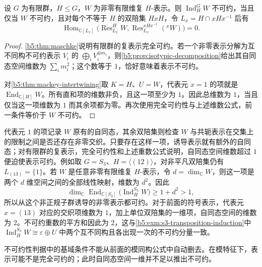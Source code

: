 \begin{theorem}\label{b5:thm:mackey-irreducibility}
	设 \(G\) 为有限群，\(H\leq G\)，\(W\) 为非零有限维复 \(H\)-表示。则 \(\operatorname{Ind}_H^G W\) 不可约，当且仅当 \(W\) 不可约，且对每个不等于 \(H\) 的双陪集 \(HxH\)，令 \(L_x=H\cap xHx^{-1}\) 后有
	\[
		\operatorname{Hom}_{\mathbb C[L_x]} \bigl(\operatorname{Res}_{L_x}^H W, \operatorname{Res}_{L_x}^{xHx^{-1}}({}^xW)\bigr)=0.
	\]
\end{theorem}
\begin{proof}
	\cref{b5:thm:maschke}说明有限群的复表示完全可约。若一个非零表示分解为互不同构不可约表示 \(V_i\) 的 \(\bigoplus_iV_i^{\oplus m_i}\)，则\cref{b5:prop:isotypic-decomposition}给出其自同态空间维数为 \(\sum_i m_i^2\)；这个数等于 \(1\)，恰好意味着表示不可约。

	对\cref{b5:thm:mackey-intertwining}取 \(K=H\)、\(U=W\)，代表元 \(x=1\) 的项就是 \(\operatorname{End}_{\mathbb C[H]}W\)。所有直和项的维数非负，且这一项至少为 \(1\)。因此总维数为 \(1\)，当且仅当这一项维数为 \(1\) 而其余项都为零。再次使用完全可约性与上述维数公式，前一条件等价于 \(W\) 不可约。
\end{proof}

代表元 \(1\) 的项记录 \(W\) 原有的自同态，其余双陪集则检查 \(W\) 与共轭表示在交集上的限制之间是否还存在非零交织。只要存在这样一项，诱导表示就有额外的自同态；对有限群的复表示，完全可约性和上述重数公式说明，自同态空间维数超过 \(1\) 便迫使表示可约。例如取 \(G=S_3\)、\(H=\langle(12)\rangle\)，对非平凡双陪集仍有 \(L_{(13)}=\{1\}\)。若 \(W\) 是任意非零有限维复 \(H\)-表示，令 \(d=\dim_{\mathbb C}W\)，则这一项是两个 \(d\) 维空间之间的全部线性映射，维数为 \(d^2\)。因此
\[
	\dim_{\mathbb C}\operatorname{End}_{\mathbb C[S_3]} \bigl(\operatorname{Ind}_H^{S_3}W\bigr) \geq 1+d^2>1,
\]
所以从这个非正规子群诱导的非零表示都可约。对于前面的符号表示，代表元 \(x=(13)\) 对应的交织项维数为 \(1\)，加上单位双陪集的一维项，自同态空间的维数为 \(2\)。不可约重数的平方和因此为 \(2\)，这与\cref{b5:exm:s3-transposition-induction}中 \(\operatorname{Ind}_H^{S_3}W\cong\varepsilon\oplus U\) 中两个互不同构且各出现一次的不可约分量一致。

\ProseParagraphBreak

不可约性判据中的基域条件不能从前面的模同构公式中自动删去。在模特征下，表示可能不是完全可约的；此时自同态空间一维并不足以推出不可约。

